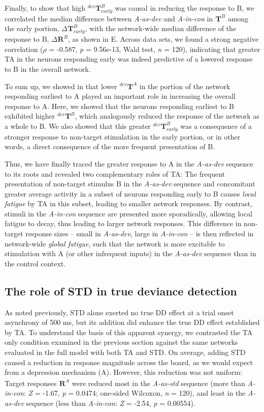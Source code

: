 \documentclass[9pt,lineno,onehalfspacing]{elife}
\newcommand{\dev}{\textit{A-as-dev}}
\newcommand{\msc}{\textit{A-in-con}}
\newcommand{\std}{\textit{A-as-std}}
\newcommand{\R}[3][]{{}^{#1}_{}\boldsymbol R^{#2}_{#3}}
\newcommand{\T}[3][]{{}^{#1}_{}\boldsymbol T^{#2}_{#3}}
\newcommand{\mean}[1]{\overline{#1}}
\begin{document}
Finally, to show that high $\T[dev]{B}{early}$ was causal in reducing the response to B, we correlated the median difference between \dev{} and \msc{} in $\T{B}{}$ among the early portion, $\Delta \T{B}{early}$, with the network-wide median difference of the response to B, $\Delta \R{B}{}$, as shown in E. Across data sets, we found a strong negative correlation ($\rho$ = -0.587, \textit{p} = 9.56e-13, Wald test, \textit{n} = 120), indicating that greater TA in the neurons responding early was indeed predictive of a lowered response to B in the overall network.

To sum up, we showed in  that lower $\T[dev]{A}{}$ in the portion of the network responding earliest to A played an important role in increasing the overall response to A. Here, we showed that the neurons responding earliest to B exhibited higher $\T[dev]{B}{}$, which analogously reduced the response of the network as a whole to B. We also showed that this greater $\T[dev]{B}{early}$ was a consequence of a stronger response to non-target stimulation in the early portion, or in other words, a direct consequence of the more frequent presentation of B.

Thus, we have finally traced the greater response to A in the \dev{} sequence to its roots and revealed two complementary roles of TA: The frequent presentation of non-target stimulus B in the \dev{} sequence and concomitant greater average activity in a subset of neurons responding early to B causes \emph{local fatigue} by TA in this subset, leading to smaller network responses. By contrast, stimuli in the \msc{} sequence are presented more sporadically, allowing local fatigue to decay, thus leading to larger network responses. This difference in non-target response sizes -- small in \dev{}, large in \msc{} -- is then reflected in network-wide \emph{global fatigue}, such that the network is more excitable to stimulation with A (or other infrequent inputs) in the \dev{} sequence than in the control context.

\subsection{The role of STD in true deviance detection}\label{sec:std}

As noted previously, STD alone exerted no true DD effect at a trial onset asynchrony of 500 ms, but its addition did enhance the true DD effect established by TA. To understand the basis of this apparent synergy, we contrasted the TA only condition examined in the previous section against the same networks evaluated in the full model with both TA and STD. On average, adding STD caused a reduction in response magnitude across the board, as we would expect from a depression mechanism (A). However, this reduction was not uniform: Target responses $\mean{\R{A}{}}$ were reduced most in the \std{} sequence (more than \msc{}: \textit{Z} = -1.67, \textit{p} = 0.0474; one-sided Wilcoxon, \textit{n} = 120), and least in the \dev{} sequence (less than \msc{}: \textit{Z} = -2.54, \textit{p} = 0.00554).
\end{document}
